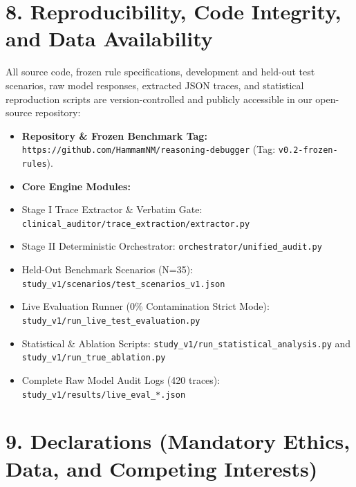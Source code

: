 \documentclass[10pt,a4paper]{article}
\begin{document}
\section*{8. Reproducibility, Code Integrity, and Data Availability}

All source code, frozen rule specifications, development and held-out test scenarios, raw model responses, extracted JSON traces, and statistical reproduction scripts are version-controlled and publicly accessible in our open-source repository:
\begin{itemize}
  \item \textbf{Repository \& Frozen Benchmark Tag:} \texttt{https://github.com/HammamNM/reasoning-debugger} (Tag: \texttt{v0.2-frozen-rules}).
  \item \textbf{Core Engine Modules:}
  \item Stage I Trace Extractor \& Verbatim Gate: \texttt{clinical\_\allowbreak{}auditor/trace\_\allowbreak{}extraction/extractor.py}
  \item Stage II Deterministic Orchestrator: \texttt{orchestrator/unified\_\allowbreak{}audit.py}
  \item Held-Out Benchmark Scenarios (N=35): \texttt{study\_\allowbreak{}v1/scenarios/test\_\allowbreak{}scenarios\_\allowbreak{}v1.json}
  \item Live Evaluation Runner (0\% Contamination Strict Mode): \texttt{study\_\allowbreak{}v1/run\_\allowbreak{}live\_\allowbreak{}test\_\allowbreak{}evaluation.py}
  \item Statistical \& Ablation Scripts: \texttt{study\_\allowbreak{}v1/run\_\allowbreak{}statistical\_\allowbreak{}analysis.py} and \texttt{study\_\allowbreak{}v1/run\_\allowbreak{}true\_\allowbreak{}ablation.py}
  \item Complete Raw Model Audit Logs (420 traces): \texttt{study\_\allowbreak{}v1/results/live\_\allowbreak{}eval\_\allowbreak{}*.json}
\end{itemize}



\section*{9. Declarations (Mandatory Ethics, Data, and Competing Interests)}
\end{document}
